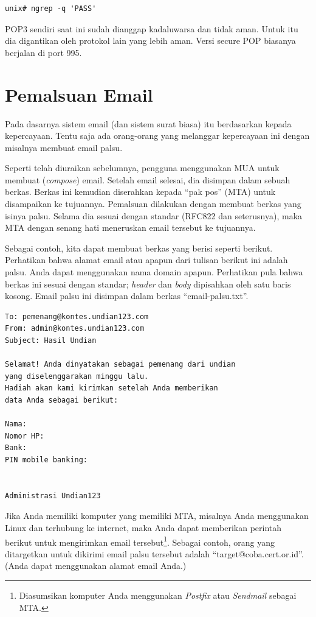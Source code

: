 \begin{mdframed}
\begin{verbatim}
unix# ngrep -q 'PASS'
\end{verbatim}
\end{mdframed}

POP3 sendiri saat ini sudah dianggap kadaluwarsa dan tidak aman. Untuk itu dia
digantikan oleh protokol lain yang lebih aman. Versi secure POP biasanya
berjalan di port 995.


\section{Pemalsuan Email}
Pada dasarnya sistem email (dan sistem surat biasa) itu berdasarkan kepada
kepercayaan. Tentu saja ada orang-orang yang melanggar kepercayaan ini dengan
misalnya membuat email palsu.

Seperti telah diuraikan sebelumnya, pengguna menggunakan MUA untuk membuat
({\em compose}) email. Setelah email selesai, dia disimpan dalam sebuah berkas.
Berkas ini kemudian diserahkan kepada ``pak pos'' (MTA) untuk disampaikan ke
tujuannya. Pemalsuan dilakukan dengan membuat berkas yang isinya palsu. Selama
dia sesuai dengan standar (RFC822 dan seterusnya), maka MTA dengan senang hati
meneruskan email tersebut ke tujuannya.

Sebagai contoh, kita dapat membuat berkas yang berisi seperti berikut.
Perhatikan bahwa alamat email atau apapun dari tulisan berikut ini adalah
palsu. Anda dapat menggunakan nama domain apapun. Perhatikan pula bahwa berkas
ini sesuai dengan standar; {\em header} dan {\em body} dipisahkan oleh satu
baris kosong. Email palsu ini disimpan dalam berkas ``email-palsu.txt''.

\begin{mdframed}
   \begin{verbatim}
To: pemenang@kontes.undian123.com
From: admin@kontes.undian123.com
Subject: Hasil Undian

Selamat! Anda dinyatakan sebagai pemenang dari undian
yang diselenggarakan minggu lalu. 
Hadiah akan kami kirimkan setelah Anda memberikan 
data Anda sebagai berikut:

Nama:
Nomor HP:
Bank:
PIN mobile banking:


Administrasi Undian123
   \end{verbatim}
\end{mdframed}


Jika Anda memiliki komputer yang memiliki MTA, misalnya Anda menggunakan Linux
dan terhubung ke internet, maka Anda dapat memberikan perintah berikut untuk
mengirimkan email tersebut\footnote{Diasumsikan komputer Anda menggunakan {\em
Postfix} atau {\em Sendmail} sebagai MTA.}. Sebagai contoh, orang yang
ditargetkan untuk dikirimi email palsu tersebut adalah
``target@coba.cert.or.id''.  (Anda dapat menggunakan alamat email Anda.)

